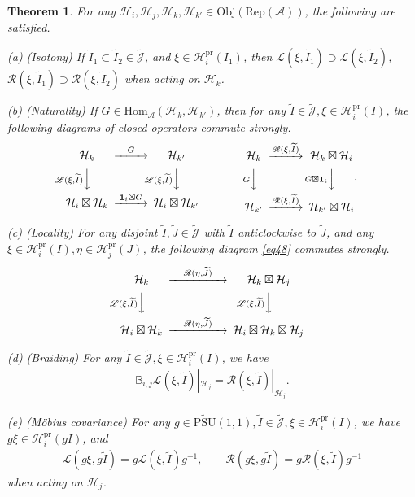 \documentclass[11pt,b5paper,notitlepage]{article}
\theoremstyle{definition}
\theoremstyle{plain}
\newtheorem{thm}[df]{Theorem}
\newcommand{\mc}{\mathcal}
\newcommand{\wtd}{\widetilde}
\newcommand{\id}{\mathbf{1}}
\newcommand{\Hom}{\mathrm{Hom}}
\newcommand{\UPSU}{\widetilde{\mathrm{PSU}}(1,1)}
\newcommand{\scr}{\mathscr}
\newcommand{\Jtd}{\widetilde{\mathcal J}}
\newcommand{\RepA}{\mathrm{Rep}(\mc A)}
\newcommand{\mbb}{\mathbb}
\newcommand{\Obj}{\mathrm{Obj}}
\newcommand{\pr}{\mathrm{pr}}
\numberwithin{equation}{subsection}
\begin{document}
\begin{thm}\label{lb13}
	For any $\mc H_i,\mc H_j,\mc H_k,\mc H_{k'}\in\Obj(\RepA)$, the following are satisfied.
	
	(a) (Isotony) If $\wtd I_1\subset\wtd I_2\in\Jtd$, and $\xi\in\mc H_i^\pr(I_1)$, then $\scr L(\xi,\wtd I_1)\supset \scr L(\xi,\wtd I_2)$, $\scr R(\xi,\wtd I_1)\supset \scr R(\xi,\wtd I_2)$ when acting on   $\mc H_k$.
	
	(b) (Naturality) If $G\in\Hom_{\mc A}(\mc H_k,\mc H_{k'})$, then for any $\wtd I\in\Jtd,\xi\in\mc H_i^\pr(I)$, the following diagrams of closed operators commute strongly.
	\begin{gather}
	\begin{CD}
	\mc H_k @>G>> \mc H_{k'}\\
	@V \scr L(\xi,\wtd I)  VV @V \scr L(\xi,\wtd I)  VV\\
	\mc H_i\boxtimes\mc H_k @> \id_i\boxtimes G>> \mc H_i\boxtimes\mc H_{k'}
	\end{CD}\qquad\qquad
	\begin{CD}
	\mc H_k @> \scr R(\xi,\wtd I)  >> \mc H_k\boxtimes\mc H_i\\
	@V G VV @V G\boxtimes\id_i  VV\\
	\mc H_{k'} @>\scr R(\xi,\wtd I) >> \mc H_{k'}\boxtimes\mc H_i
	\end{CD}.\label{eq45}
	\end{gather}
	
	
	
	(c) (Locality) For any  disjoint $\wtd I,\wtd J\in\Jtd$ with $\wtd I$ anticlockwise to $\wtd J$, and any $\xi\in\mc H_i^\pr(I),\eta\in\mc H_j^\pr(J)$, the following diagram \eqref{eq48}  commutes strongly.
	\begin{align}
	\begin{CD}
	\mc H_k @> \quad \scr R(\eta,\wtd J)\quad   >> \mc H_k\boxtimes\mc H_j\\
	@V \scr L(\xi,\wtd I)   V  V @V \scr L(\xi,\wtd I) VV\\
	\mc H_i\boxtimes\mc H_k @> \quad \scr R(\eta,\wtd J) \quad  >> \mc H_i\boxtimes\mc H_k\boxtimes\mc H_j
	\end{CD}\label{eq48}
	\end{align}
	
	
	(d) (Braiding) For any $\wtd I\in\Jtd,\xi\in\mc H_i^\pr(I)$, we have
	\begin{align}
	\mbb B_{i,j} \scr L(\xi,\wtd I)|_{\mc H_j}=\scr R(\xi,\wtd I)|_{\mc H_j}.\label{eq49}
	\end{align}
	
	(e) (M\"obius covariance) For any $g\in\UPSU,\wtd I\in\wtd{\mc J},\xi\in\mc H_i^\pr(I)$, we have $g\xi\in\mc H_i^\pr(g I)$, and
	\begin{align}
	\scr L(g\xi,g\wtd I)=g\scr L(\xi,\wtd I)g^{-1},\qquad \scr R(g\xi,g\wtd I)=g\scr R(\xi,\wtd I)g^{-1}\label{eq46}
	\end{align}
	when acting on $\mc H_j$.
\end{thm}
\end{document}

